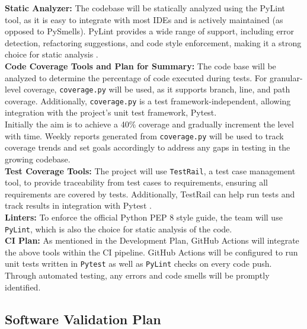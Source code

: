 \documentclass[12pt, titlepage]{article}
\begin{document}
\noindent\textbf{Static Analyzer:} The codebase will be statically analyzed using the PyLint tool, as it is easy to integrate with most IDEs and is actively maintained (as opposed to PySmells). PyLint provides a wide range of support, including error detection, refactoring suggestions, and code style enforcement, making it a strong choice for static analysis \citep{pylint}.\\

\noindent\textbf{Code Coverage Tools and Plan for Summary:} The code base will be analyzed to determine the percentage of code executed during tests. For granular-level coverage, \texttt{coverage.py} will be used, as it supports branch, line, and path coverage. Additionally, \texttt{coverage.py} is a test framework-independent, allowing integration with the project's unit test framework, Pytest.\\
Initially the aim is to achieve a 40\% coverage and gradually increment the level with time. Weekly reports generated from \texttt{coverage.py} will be used to track coverage trends and set goals accordingly to address any gaps in testing in the growing codebase.\\


\noindent\textbf{Test Coverage Tools:} The project will use \texttt{TestRail}, a test case management tool, to provide traceability from test cases to requirements, ensuring all requirements are covered by tests. Additionally, TestRail can help run tests and track results in integration with Pytest \citep{testrail}.\\


\noindent\textbf{Linters:} To enforce the official Python PEP 8 style guide, the team will use \texttt{PyLint}, which is also the choice for static analysis of the code.\\

\noindent\textbf{CI Plan:} As mentioned in the Development Plan, GitHub Actions will integrate the above tools within the CI pipeline. GitHub Actions will be configured to run unit tests written in \texttt{Pytest} as well as \texttt{PyLint} checks on every code push. Through automated testing, any errors and code smells will be promptly identified.\\

\subsection{Software Validation Plan}
\end{document}
